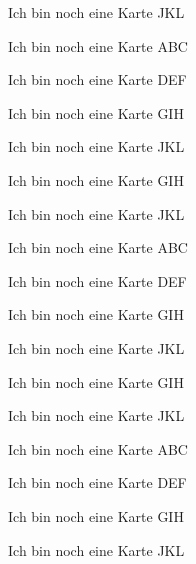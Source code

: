 \documentclass[a9paper,8pt,print,grid=both,flip]{kartei}
\begin{document}
			\begin{karte}{Ich bin noch eine Karte}
				JKL
			\end{karte}
			\begin{karte}{Ich bin noch eine Karte}
				ABC
			\end{karte}
			\begin{karte}{Ich bin noch eine Karte}
				DEF
			\end{karte}
			\begin{karte}{Ich bin noch eine Karte}
				GIH
			\end{karte}
			\begin{karte}{Ich bin noch eine Karte}
				JKL
			\end{karte}	\begin{karte}{Ich bin noch eine Karte}
					GIH
				\end{karte}
				\begin{karte}{Ich bin noch eine Karte}
					JKL
				\end{karte}
				\begin{karte}{Ich bin noch eine Karte}
					ABC
				\end{karte}
				\begin{karte}{Ich bin noch eine Karte}
					DEF
				\end{karte}
				\begin{karte}{Ich bin noch eine Karte}
					GIH
				\end{karte}
				\begin{karte}{Ich bin noch eine Karte}
					JKL
				\end{karte}	\begin{karte}{Ich bin noch eine Karte}
						GIH
					\end{karte}
					\begin{karte}{Ich bin noch eine Karte}
						JKL
					\end{karte}
					\begin{karte}{Ich bin noch eine Karte}
						ABC
					\end{karte}
					\begin{karte}{Ich bin noch eine Karte}
						DEF
					\end{karte}
					\begin{karte}{Ich bin noch eine Karte}
						GIH
					\end{karte}
					\begin{karte}{Ich bin noch eine Karte}
						JKL
					\end{karte}
\end{document}
